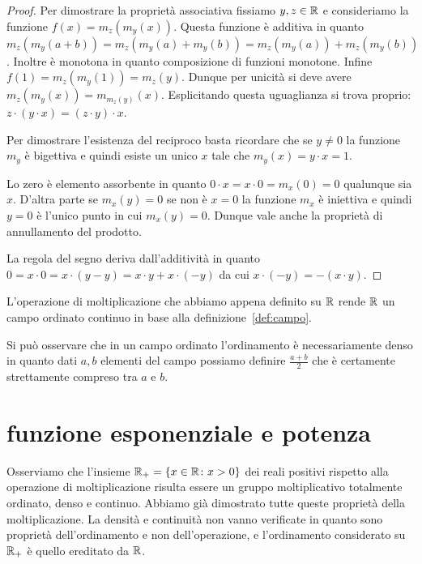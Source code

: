 \begin{proof}
Per dimostrare la proprietà associativa fissiamo $y,z\in {\mathbb R}$
e consideriamo la funzione $f(x) = m_z(m_y(x))$.
Questa funzione è additiva in quanto $m_z(m_y(a+b)) = m_z(m_y(a)+m_y(b))
=m_z(m_y(a)) + m_z(m_y(b))$. 
Inoltre è monotona in quanto composizione di funzioni monotone.
Infine $f(1) = m_z(m_y(1)) = m_z(y)$. 
Dunque per unicità si deve avere $m_z(m_y(x)) = m_{m_z(y)}(x)$.
Esplicitando questa uguaglianza si trova proprio: $z\cdot(y\cdot x) = (z\cdot y)\cdot x$.

Per dimostrare l'esistenza del reciproco basta ricordare che 
se $y\neq 0$ la funzione $m_y$ è bigettiva e quindi 
esiste un unico $x$ tale che $m_y(x)=y\cdot x = 1$.

Lo zero è elemento assorbente in quanto $0 \cdot x = x\cdot 0 = m_x(0)=0$
qualunque sia $x$.
D'altra parte se $m_x(y) = 0$ se non è $x=0$ la funzione $m_x$ è iniettiva 
e quindi $y=0$ è l'unico punto in cui $m_x(y)=0$. 
Dunque vale anche la proprietà di annullamento del prodotto.

La regola del segno deriva dall'additività in quanto 
$0 = x\cdot 0 = x\cdot (y-y) = x\cdot y + x \cdot (-y)$
da cui $x\cdot (-y) = -(x\cdot y)$.
\end{proof}

L'operazione di moltiplicazione che abbiamo appena definito su ${\mathbb R}$ 
rende ${\mathbb R}$ un campo ordinato continuo in base alla definizione~\ref{def:campo}.

Si può osservare che in un campo ordinato l'ordinamento 
è necessariamente denso in quanto dati $a,b$ elementi 
del campo possiamo definire $\frac{a+b}{2}$ che è certamente 
strettamente compreso tra $a$ e $b$.

\section{funzione esponenziale e potenza}
\label{sec:esponenziale}

Osserviamo che l'insieme ${\mathbb R}_+ = {\left\{ x\in {\mathbb R}\colon x>0 \right\}}$ 
dei reali positivi rispetto alla operazione di moltiplicazione 
risulta essere un gruppo moltiplicativo totalmente ordinato, 
denso e continuo. 
Abbiamo già dimostrato tutte queste proprietà della moltiplicazione.
La densità e continuità non vanno verificate in quanto sono proprietà 
dell'ordinamento e non dell'operazione, e l'ordinamento considerato 
su ${\mathbb R}_+$ è quello ereditato da ${\mathbb R}$.

